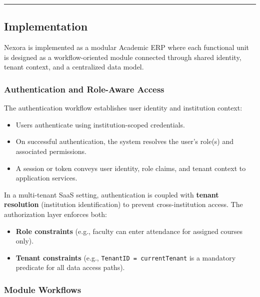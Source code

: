 \documentclass[11pt]{article}
\providecommand{\tightlist}{%
  \setlength{\itemsep}{0pt}\setlength{\parskip}{0pt}}
\begin{document}
\begin{center}\rule{0.5\linewidth}{0.5pt}\end{center}

\subsection{Implementation}\label{implementation}

Nexora is implemented as a modular Academic ERP where each functional
unit is designed as a workflow-oriented module connected through shared
identity, tenant context, and a centralized data model.

\subsubsection{Authentication and Role-Aware
Access}\label{authentication-and-role-aware-access}

The authentication workflow establishes user identity and institution
context:

\begin{itemize}
\tightlist
\item
  Users authenticate using institution-scoped credentials.
\item
  On successful authentication, the system resolves the user's role(s)
  and associated permissions.
\item
  A session or token conveys user identity, role claims, and tenant
  context to application services.
\end{itemize}

In a multi-tenant SaaS setting, authentication is coupled with
\textbf{tenant resolution} (institution identification) to prevent
cross-institution access. The authorization layer enforces both:

\begin{itemize}
\tightlist
\item
  \textbf{Role constraints} (e.g., faculty can enter attendance for
  assigned courses only).
\item
  \textbf{Tenant constraints} (e.g., \texttt{TenantID\ =\ currentTenant}
  is a mandatory predicate for all data access paths).
\end{itemize}

\subsubsection{Module Workflows}\label{module-workflows}
\end{document}
